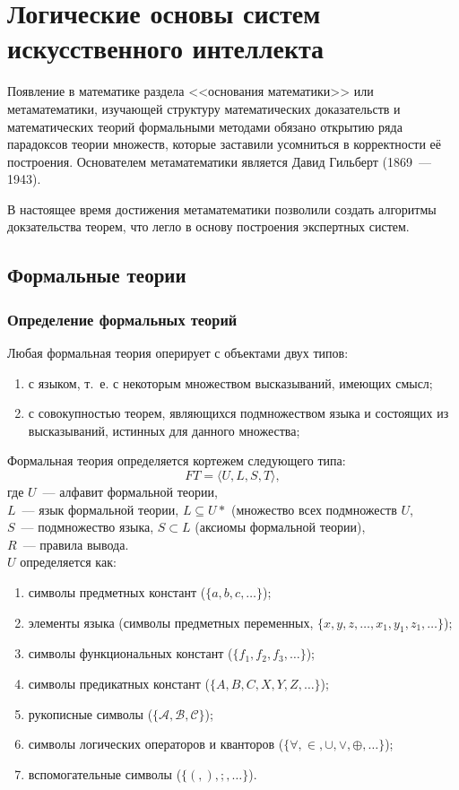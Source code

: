 \documentclass[a4paper,12pt]{report}
\begin{document}
\chapter{Логические основы систем искусственного интеллекта}
	Появление в математике раздела <<основания математики>> или метаматематики,
	изучающей структуру математических доказательств и математических теорий
	формальными методами обязано открытию ряда парадоксов теории множеств,
	которые заставили усомниться в корректности её построения. Основателем
	метаматематики является	Давид Гильберт (1869~--- 1943).

	В настоящее время достижения метаматематики позволили создать алгоритмы
	докзательства теорем, что легло в основу построения экспертных систем.


\section{Формальные теории}


\subsection{Определение формальных теорий}

	Любая формальная теория оперирует с объектами двух типов:
	\begin{enumerate}
		\item с языком, т.~е. с некоторым множеством высказываний, имеющих смысл;
		\item с совокупностью теорем, являющихся подмножеством языка и состоящих
			из высказываний, истинных для данного множества;
	\end{enumerate}

	Формальная теория определяется кортежем следующего типа:
	$$ FT = \langle U, L, S, T \rangle, $$
	где $ U $~--- алфавит формальной теории,\\
	$ L $~--- язык формальной теории, $ L \subseteq U* $ (множество всех
	подмножеств $ U $,\\
	$ S $~--- подмножество языка, $ S \subset L $ (аксиомы формальной теории),\\
	$ R $~--- правила вывода.\\

	$ U $ определяется как:
	\begin{enumerate}
		\item символы предметных констант ($ \{a, b, c, \dots \} $);
		\item элементы языка (символы предметных переменных, $ \{x, y, z, \dots,
			x_1, y_1, z_1, \dots \} $);
		\item символы функциональных констант ($ \{f_1, f_2, f_3, \dots \} $);
		\item символы предикатных констант ($ \{A, B, C, X, Y, Z, \dots \} $);
		\item рукописные символы ($ \{\mathscr{A, B, C} \} $);
		\item символы логических операторов и кванторов ($ \{\forall, \in, \cup,
			\vee, \oplus, \dots\} $);
		\item вспомогательные символы ($ \{(, ), ;, \dots\} $).\\
	\end{enumerate}
\end{document}
